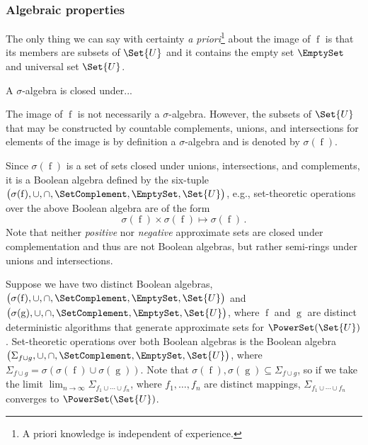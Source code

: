 \documentclass[ ../main.tex]{subfiles}
\begin{document}
\subsubsection{Algebraic properties}
The only thing we can say with certainty \emph{a priori}\footnote{A priori 
knowledge is independent of experience.}  about the image of $\operatorname{f}$ 
is that its members are subsets of $\Set{U}$ and it contains the empty set 
$\EmptySet$ and universal set $\Set{U}$.
\begin{definition}
A $\sigma$-algebra is closed under...
\end{definition}
The image of $\operatorname{f}$ is not necessarily a $\sigma$-algebra. However, 
the subsets of $\Set{U}$ that may be constructed by countable complements, 
unions, and intersections for elements of the image is by definition a 
$\sigma$-algebra and is denoted by $\sigma(\operatorname{f})$.

Since $\sigma(\operatorname{f})$ is a set of sets closed under unions, 
intersections, and complements, it is a Boolean algebra defined by the six-tuple 
$\left(
    \sigma(\operatorname{f}), \cup, \cap, \SetComplement, \EmptySet,\Set{U}
\right)$,
e.g., set-theoretic operations over the above Boolean algebra are of the form
\begin{equation}
    \sigma(\operatorname{f}) \times \sigma(\operatorname{f}) 
        \mapsto \sigma(\operatorname{f})\,.
\end{equation}
Note that neither \emph{positive} nor \emph{negative} approximate sets are closed under complementation and thus are not Boolean algebras, but rather semi-rings under unions and intersections.

Suppose we have two distinct Boolean algebras,
$\left(
    \sigma(\operatorname{f}), \cup, \cap, \SetComplement, \EmptySet,\Set{U}
\right)$ and 
$\left(
    \sigma(\operatorname{g}), \cup, \cap, \SetComplement, \EmptySet,\Set{U}
\right)$,
where $\operatorname{f}$ and $\operatorname{g}$ are distinct deterministic
algorithms that generate approximate sets for $\PowerSet(\Set{U})$.
Set-theoretic operations over both Boolean algebras is the Boolean algebra
$\left(
    \Sigma_{f \cup g}, \cup, \cap, \SetComplement, \EmptySet,\Set{U}
\right)$,
where $\Sigma_{f \cup g} = 
    \sigma\!\left(\sigma(\operatorname{f}) \cup \sigma(\operatorname{g})
\right)$.
Note that $\sigma(\operatorname{f}), \sigma(\operatorname{g}) 
    \subseteq \Sigma_{f \cup g}$,
so if we take the limit
    $\lim_{n \to \infty} \Sigma_{f_1 \cup \cdots \cup f_n}$,
where $f_1,\ldots,f_n$ are distinct mappings, $\Sigma_{f_1 \cup \cdots \cup f_n}$ converges to $\PowerSet(\Set{U})$.
\end{document}

